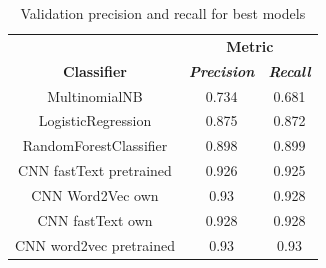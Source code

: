 \documentclass[conference]{IEEEtran}
\begin{document}
\begin{table}[htbp]
\caption{Validation precision and recall for best models}
\begin{center}
\begin{tabular}{|c|c|c|}
\hline
\textbf{}&\multicolumn{2}{|c|}{\textbf{Metric}} \\ 
\cline{2-3}
\textbf{Classifier} & \textbf{\textit{Precision}}& \textbf{\textit{Recall}} \\ 
\hline
MultinomialNB & 0.734 & 0.681 \\ 
\hline
LogisticRegression & 0.875 & 0.872 \\ 
\hline
RandomForestClassifier & 0.898 & 0.899 \\ 
\hline
CNN fastText pretrained & 0.926 & 0.925 \\ 
\hline
CNN Word2Vec own & 0.93 & 0.928 \\ 
\hline
CNN fastText own & 0.928 & 0.928 \\ 
\hline
CNN word2vec pretrained & 0.93 & 0.93 \\ 
\hline
\end{tabular}
\label{tab2}
\end{center}
\end{table}
\end{document}
